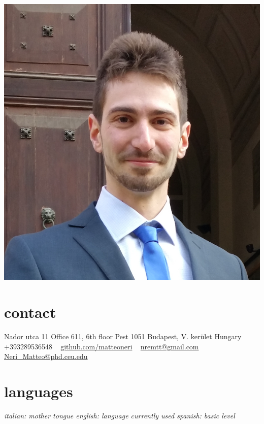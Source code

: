 \documentclass[]{cv-style}     %
\begin{document}
\lastupdated

\begin{aside}
\includegraphics[scale=0.08]{profile.jpeg}
%
\section{contact}
Nador utca 11
Office 611, 6th floor
Pest 1051
Budapest, V. ker\"ulet
Hungary
~
+393289536548
~
\href{https://github.com/matteoneri}{github.com/matteoneri}
~
\href{mailto:nremtt@gmail.com}{nremtt@gmail.com}
\href{mailto:Neri\_Matteo@phd.ceu.edu}{Neri\_Matteo@phd.ceu.edu}
%
\section{languages}
\it{italian}: mother tongue
\it{english}: language currently used
\it{spanish}: basic level
\end{aside}
\end{document}
